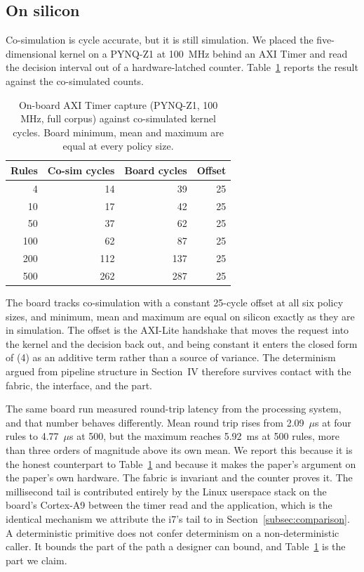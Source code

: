 \documentclass[conference]{IEEEtran}
\newcommand{\new}[1]{\textcolor{hkred}{#1}}
\newcommand{\newcolor}{\color{hkred}}
\begin{document}
\subsection{\new{On silicon}}
\label{subsec:onsilicon}

\new{Co-simulation is cycle accurate, but it is still simulation. We placed the five-dimensional kernel on a PYNQ-Z1 at 100~MHz behind an AXI Timer and read the decision interval out of a hardware-latched counter. Table~\ref{tab:board} reports the result against the co-simulated counts.}

\begin{table}[t]
\caption{\new{On-board AXI Timer capture (PYNQ-Z1, 100 MHz, full corpus) against co-simulated kernel cycles. Board minimum, mean and maximum are equal at every policy size.}}
\label{tab:board}
\centering
\newcolor
\begin{tabular}{rrrr}
\toprule
Rules & Co-sim cycles & Board cycles & Offset \\
\midrule
4 & 14 & 39 & 25 \\
10 & 17 & 42 & 25 \\
50 & 37 & 62 & 25 \\
100 & 62 & 87 & 25 \\
200 & 112 & 137 & 25 \\
500 & 262 & 287 & 25 \\
\bottomrule
\end{tabular}
\end{table}

\new{The board tracks co-simulation with a constant 25-cycle offset at all six policy sizes, and minimum, mean and maximum are equal on silicon exactly as they are in simulation. The offset is the AXI-Lite handshake that moves the request into the kernel and the decision back out, and being constant it enters the closed form of (4) as an additive term rather than a source of variance. The determinism argued from pipeline structure in Section~IV therefore survives contact with the fabric, the interface, and the part.}

\new{The same board run measured round-trip latency from the processing system, and that number behaves differently. Mean round trip rises from 2.09~$\mu$s at four rules to 4.77~$\mu$s at 500, but the maximum reaches 5.92~ms at 500 rules, more than three orders of magnitude above its own mean. We report this because it is the honest counterpart to Table~\ref{tab:board} and because it makes the paper's argument on the paper's own hardware. The fabric is invariant and the counter proves it. The millisecond tail is contributed entirely by the Linux userspace stack on the board's Cortex-A9 between the timer read and the application, which is the identical mechanism we attribute the i7's tail to in Section~\ref{subsec:comparison}. A deterministic primitive does not confer determinism on a non-deterministic caller. It bounds the part of the path a designer can bound, and Table~\ref{tab:board} is the part we claim.}
\end{document}
